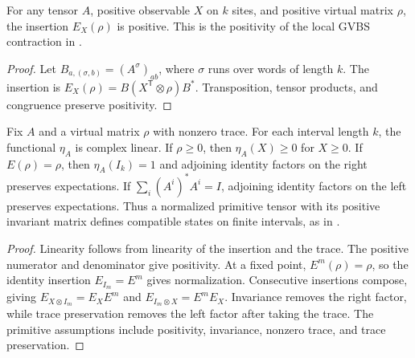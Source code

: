 \begin{lemma}
    \label{thm:primitive_insertion_positive}
    \leanok
    For any tensor $A$, positive observable $X$ on $k$ sites, and positive
    virtual matrix $\rho$, the insertion $E_X(\rho)$ is positive.
    This is the positivity of the local GVBS contraction in
    \cite[Section~3, equations (3.1)--(3.2b)]{Nachtergaele1996Spectral}.
\end{lemma}
\begin{proof}\leanok
    Let $B_{a,(\sigma,b)}=(A^\sigma)_{ab}$, where $\sigma$ runs over
    words of length $k$. The insertion is
    $E_X(\rho)=B(X^{\mathsf T}\otimes\rho)B^*$.
    Transposition, tensor products, and congruence preserve positivity.
\end{proof}

\begin{lemma}
    \label{thm:primitive_insertion_local_state}
    \leanok
    Fix $A$ and a virtual matrix $\rho$ with nonzero trace. For each
    interval length $k$, the functional $\eta_A$ is complex linear.
    If $\rho\geq0$, then $\eta_A(X)\geq0$ for $X\geq0$.
    If $E(\rho)=\rho$, then $\eta_A(I_k)=1$ and adjoining identity
    factors on the right preserves expectations. If
    $\sum_i(A^i)^*A^i=I$, adjoining identity factors on the left
    preserves expectations. Thus a normalized primitive tensor with
    its positive invariant matrix defines compatible states on finite
    intervals, as in
    \cite[Section~3, equations (3.1)--(3.2b)]{Nachtergaele1996Spectral}.
\end{lemma}
\begin{proof}\leanok
    Linearity follows from linearity of the insertion and the trace.
    The positive numerator and denominator give positivity.
    At a fixed point, $E^m(\rho)=\rho$, so the identity insertion
    $E_{I_m}=E^m$ gives normalization. Consecutive insertions compose,
    giving $E_{X\otimes I_m}=E_XE^m$ and
    $E_{I_m\otimes X}=E^mE_X$. Invariance removes the right factor,
    while trace preservation removes the left factor after taking the
    trace. The primitive assumptions include positivity, invariance,
    nonzero trace, and trace preservation.
\end{proof}

